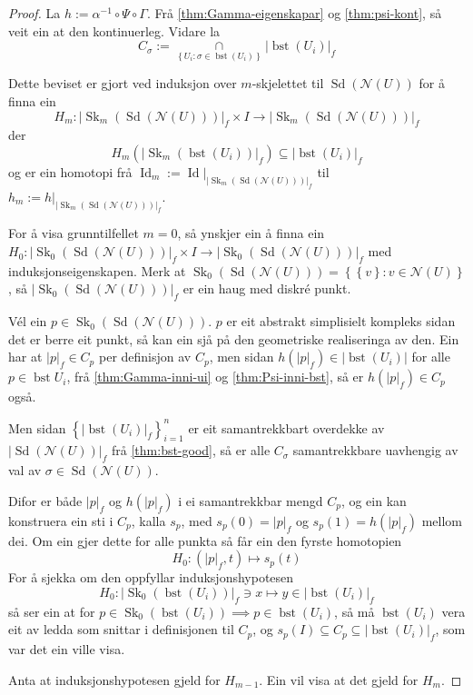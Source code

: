 \documentclass[a4paper, 12pt, norsk]{article}
\theoremstyle{plain}
\theoremstyle{definition}
\newcommand{\Nc}{\mathcal{N}}
\newcommand{\intersect}{ \mathop{\cap}\limits }
\newcommand{\gr}[1]{ \lvert #1 \rvert } %
\newcommand{\set}[1]{ \left\{ #1 \right\} } %
\DeclareMathOperator{\Sd}{Sd} %
\DeclareMathOperator{\bst}{bst} %
\DeclareMathOperator{\Sk}{Sk} %
\DeclareMathOperator{\Id}{Id} %
\begin{document}
\begin{proof}
	La \( h := \alpha^{-1} \circ \Psi \circ \Gamma \). Frå \autoref{thm:Gamma-eigenskapar} og \autoref{thm:psi-kont}, så veit ein at den kontinuerleg. Vidare la 
	\[ 
		C_\sigma := \intersect_{\set{ U_i : \sigma \in \bst(U_i) }} \gr{\bst(U_i)}_f
	\]

	Dette beviset er gjort ved induksjon over \( m \)-skjelettet til \( \Sd(\Nc(U)) \) for å finna ein 
	\[ 
		H_m : \gr{\Sk_m(\Sd(\Nc(U)))}_f \times I \to \gr{\Sk_m(\Sd(\Nc(U)))}_f
	\]
	der 
	\[
		H_m(\gr{\Sk_m(\bst(U_i))}_f) \subseteq \gr{\bst(U_i)}_f
	\]
	og er ein homotopi frå \( \Id_m := \Id|_{\gr{\Sk_m(\Sd(\Nc(U)))}_f} \) til \( h_m := h|_{\gr{\Sk_m(\Sd(\Nc(U)))}_f} \).

	For å visa grunntilfellet \( m = 0 \), så ynskjer ein å finna ein \( H_0: \gr{\Sk_0(\Sd(\Nc(U)))}_f \times I \to \gr{\Sk_0(\Sd(\Nc(U)))}_f \) med induksjonseigenskapen. Merk at \( \Sk_0(\Sd(\Nc(U))) = \set{\set{v} : v \in \Nc(U)} \), så \( \gr{\Sk_0(\Sd(\Nc(U)))}_f \) er ein haug med diskré punkt.

	Vél ein \( p \in \Sk_0(\Sd(\Nc(U))) \). \( p \) er eit abstrakt simplisielt kompleks sidan det er berre eit punkt, så kan ein sjå på den geometriske realiseringa av den. Ein har at \( \gr{p}_f \in C_p \) per definisjon av \( C_p \), men sidan \( h(\gr{p}_f) \in \gr{\bst(U_i)} \) for alle \( p \in \bst{U_i} \), frå \autoref{thm:Gamma-inni-ui} og \autoref{thm:Psi-inni-bst}, så er \( h(\gr{p}_f) \in C_p \) også.

	Men sidan \( \set{\gr{\bst(U_i)}_f}_{i = 1}^{n} \) er eit samantrekkbart overdekke av \( \gr{\Sd(\Nc(U))}_f \) frå \autoref{thm:bst-good}, så er alle \( C_\sigma \) samantrekkbare uavhengig av val av \( \sigma \in \Sd(\Nc(U)) \).

	Difor er både \( \gr{p}_f \) og \( h(\gr{p}_f) \) i ei samantrekkbar mengd \( C_p \), og ein kan konstruera ein sti i \( C_p \), kalla \( s_p \), med \( s_p(0) = \gr{p}_f \) og \( s_p(1) = h(\gr{p}_f) \) mellom dei. Om ein gjer dette for alle punkta så får ein den fyrste homotopien
	\[
		H_0 : (\gr{p}_f, t) \mapsto s_p(t)
	\]
	For å sjekka om den oppfyllar induksjonshypotesen
	\[
		H_0: \gr{\Sk_0(\bst(U_i))}_f \ni x \mapsto y \in \gr{\bst(U_i)}_f
	\]
	så ser ein at for \( p \in \Sk_0(\bst(U_i)) \implies p \in \bst(U_i) \), så må \( \bst(U_i) \) vera eit av ledda som snittar i definisjonen til \( C_p \), og \( s_p(I) \subseteq C_p \subseteq \gr{\bst(U_i)}_f \), som var det ein ville visa.

	Anta at induksjonshypotesen gjeld for \( H_{m-1} \). Ein vil visa at det gjeld for \( H_m \).


\end{proof}
\end{document}

